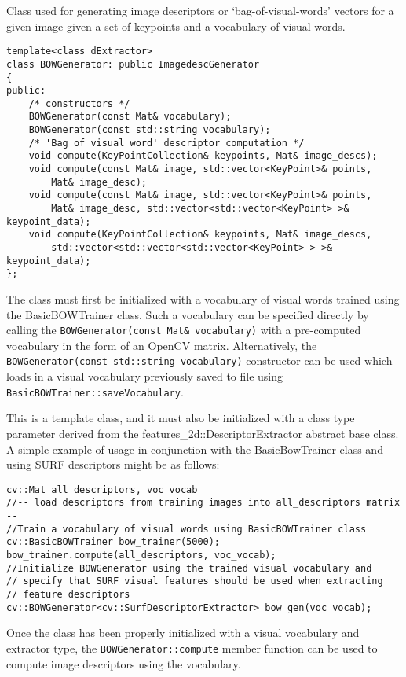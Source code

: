 Class used for generating image descriptors or `bag-of-visual-words' vectors for a given image given a set of keypoints and a vocabulary of visual words.

\begin{lstlisting}
template<class dExtractor>
class BOWGenerator: public ImagedescGenerator
{
public:
    /* constructors */
    BOWGenerator(const Mat& vocabulary);
    BOWGenerator(const std::string vocabulary);
    /* 'Bag of visual word' descriptor computation */
    void compute(KeyPointCollection& keypoints, Mat& image_descs);
    void compute(const Mat& image, std::vector<KeyPoint>& points,
        Mat& image_desc);
    void compute(const Mat& image, std::vector<KeyPoint>& points,
        Mat& image_desc, std::vector<std::vector<KeyPoint> >& keypoint_data);
    void compute(KeyPointCollection& keypoints, Mat& image_descs,
        std::vector<std::vector<std::vector<KeyPoint> > >& keypoint_data);
};
\end{lstlisting}

The class must first be initialized with a vocabulary of visual words trained using the BasicBOWTrainer class. Such a vocabulary can be specified directly by calling the \texttt{BOWGenerator(const Mat\& vocabulary)} with a pre-computed vocabulary in the form of an OpenCV matrix. Alternatively, the \texttt{BOWGenerator(const std::string vocabulary)} constructor can be used which loads in a visual vocabulary previously saved to file using \texttt{BasicBOWTrainer::saveVocabulary}.

This is a template class, and it must also be initialized with a class type parameter derived from the features\_2d::DescriptorExtractor abstract base class. A simple example of usage in conjunction with the BasicBowTrainer class and using SURF descriptors might be as follows:

\begin{lstlisting}
cv::Mat all_descriptors, voc_vocab
//-- load descriptors from training images into all_descriptors matrix --
//Train a vocabulary of visual words using BasicBOWTrainer class
cv::BasicBOWTrainer bow_trainer(5000);
bow_trainer.compute(all_descriptors, voc_vocab);
//Initialize BOWGenerator using the trained visual vocabulary and
// specify that SURF visual features should be used when extracting
// feature descriptors
cv::BOWGenerator<cv::SurfDescriptorExtractor> bow_gen(voc_vocab);
\end{lstlisting}

Once the class has been properly initialized with a visual vocabulary and extractor type, the \texttt{BOWGenerator::compute} member function can be used to compute image descriptors using the vocabulary.

